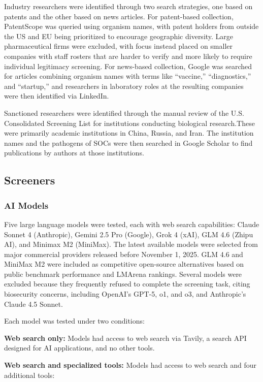 \documentclass[utf8]{FrontiersinHarvard}
\begin{document}
Industry researchers were identified through two search strategies, one based on patents and the other based on news articles. For patent-based collection, PatentScope was queried using organism names, with patent holders from outside the US and EU being prioritized to encourage geographic diversity. Large pharmaceutical firms were excluded, with focus instead placed on smaller companies with staff rosters that are harder to verify and more likely to require individual legitimacy screening. For news-based collection, Google was searched for articles combining organism names with terms like “vaccine,” “diagnostics,” and “startup,” and researchers in laboratory roles at the resulting companies were then identified via LinkedIn.

Sanctioned researchers were identified through the manual review of the U.S. Consolidated Screening List for institutions conducting biological research.These were primarily academic institutions in China, Russia, and Iran. The institution names and the pathogens of SOCs were then searched in Google Scholar to find publications by authors at those institutions.

\subsection{Screeners}

\subsubsection{AI Models}

Five large language models were tested, each with web search capabilities: Claude Sonnet 4 (Anthropic), Gemini 2.5 Pro (Google), Grok 4 (xAI), GLM 4.6 (Zhipu AI), and Minimax M2 (MiniMax). The latest available models were selected from major commercial providers released before November 1, 2025. GLM 4.6 and MiniMax M2 were included as competitive open-source alternatives based on public benchmark performance and LMArena rankings. Several models were excluded because they frequently refused to complete the screening task, citing biosecurity concerns, including OpenAI's GPT-5, o1, and o3, and Anthropic's Claude 4.5 Sonnet.

Each model was tested under two conditions:

\textbf{Web search only:} Models had access to web search via Tavily, a search API designed for AI applications, and no other tools.

\textbf{Web search and specialized tools:} Models had access to web search and four additional tools:
\end{document}
